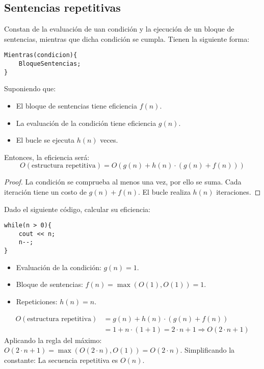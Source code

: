 \subsection{Sentencias repetitivas}
Constan de la evaluación de uan condición y la ejecución de un bloque de sentencias, mientras que dicha condición se cumpla. Tienen la siguiente forma:
\begin{listing}[H]
\begin{verbatim}
Mientras(condicion){
    BloqueSentencias;
}
\end{verbatim}
\end{listing}
Suponiendo que:
\begin{itemize}
\item El bloque de sentencias tiene eficiencia $f(n)$.
\item La evaluación de la condición tiene eficiencia $g(n)$.
\item El bucle se ejecuta $h(n)$ veces.
\end{itemize}
Entonces, la eficiencia será:
\begin{equation*}
O(\mbox{estructura repetitiva}) = O(g(n) + h(n) \cdot (g(n)+f(n)))
\end{equation*}

\begin{proof}
La condición se comprueba al menos una vez, por ello se suma.  
Cada iteración tiene un costo de $g(n) + f(n)$.  
El bucle realiza $h(n)$ iteraciones.
\end{proof}

\begin{ejemplo}
Dado el siguiente código, calcular su eficiencia:
\begin{listing}[H]
\begin{verbatim}
while(n > 0){
    cout << n;
    n--;
}
\end{verbatim}
\end{listing}
\begin{itemize}
    \item Evaluación de la condición: $g(n) = 1$.  
    \item Bloque de sentencias: $f(n) = \max(O(1), O(1)) = 1$.  
    \item Repeticiones: $h(n) = n$.  
\end{itemize}
\begin{align*}
    O(\mbox{estructura repetitiva}) &= g(n) + h(n)\cdot (g(n)+f(n)) \\
                                    &= 1+n\cdot (1+1) = 2\cdot n+1 \Rightarrow O(2\cdot n+1)
\end{align*}
Aplicando la regla del máximo: $O(2\cdot n+1) = \max(O(2\cdot n), O(1)) = O(2\cdot n)$.  
Simplificando la constante: La secuencia repetitiva es $O(n)$.

\end{ejemplo}


